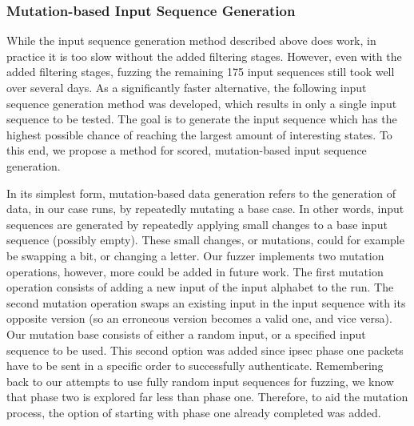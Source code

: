 \subsubsection{Mutation-based Input Sequence Generation} \label{subsubsec:mutations}
While the input sequence generation method described above does work, in practice it is too slow without the added filtering stages. However, even with the added filtering stages, fuzzing the remaining 175 input sequences still took well over several days. As a significantly faster alternative, the following input sequence generation method was developed, which results in only a single input sequence to be tested. The goal is to generate the input sequence which has the highest possible chance of reaching the largest amount of interesting states. To this end, we propose a method for scored, mutation-based input sequence generation. 

In its simplest form, mutation-based data generation refers to the generation of data, in our case runs, by repeatedly mutating a base case. In other words, input sequences are generated by repeatedly applying small changes to a base input sequence (possibly empty). These small changes, or mutations, could for example be swapping a bit, or changing a letter. Our fuzzer implements two mutation operations, however, more could be added in future work. The first mutation operation consists of adding a new input of the input alphabet to the run. The second mutation operation swaps an existing input in the input sequence with its opposite version (so an erroneous version becomes a valid one, and vice versa). Our mutation base consists of either a random input, or a specified input sequence to be used. This second option was added since \ac{ipsec} phase one packets have to be sent in a specific order to successfully authenticate. Remembering back to our attempts to use fully random input sequences for fuzzing, we know that phase two is explored far less than phase one. Therefore, to aid the mutation process, the option of starting with phase one already completed was added.

